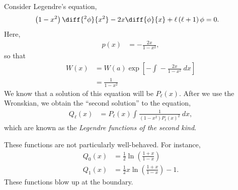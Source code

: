 \documentclass[10pt]{mypackage}
\begin{document}
  \begin{example}
    Consider Legendre's equation,
    \begin{align*}
      \left( 1-x^2 \right)\diff{^2 \phi}{x^2} - 2x\diff{\phi}{x} + \ell\left( \ell + 1 \right)\phi &= 0.
    \end{align*}
    Here,
    \begin{align*}
      p(x) &= -\frac{2x}{1-x^2},
    \end{align*}
    so that
    \begin{align*}
      W(x) &= W(a)\exp\left[ - \int_{}^{} -\frac{2x}{1-x^2}\:dx \right]\\
           &= \frac{1}{1-x^2}\tag*{$W(a)\coloneq -1$}
    \end{align*}
    We know that a solution of this equation will be $P_{\ell}\left( x \right)$. After we use the Wronskian, we obtain the ``second solution'' to the equation,
    \begin{align*}
      Q_{\ell}\left( x \right) &= P_{\ell}\left( x \right) \int_{}^{} \frac{1}{\left( 1-x^2 \right)P_{\ell}(x)^2}\:dx,
    \end{align*}
    which are known as the \textit{Legendre functions of the second kind}.\newline

    These functions are not particularly well-behaved. For instance,
    \begin{align*}
      Q_0(x) &= \frac{1}{2}\ln\left( \frac{1+x}{1-x} \right)\\
      Q_1(x) &= \frac{1}{2}x\ln\left( \frac{1 + x}{1-x} \right) - 1.
    \end{align*}
    These functions blow up at the boundary.
  \end{example}
\end{document}
